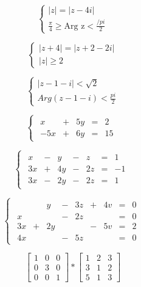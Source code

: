 \documentclass[11pt, a4paper]{article}
\begin{document}
$$\begin{cases}
    |z| = |z - 4i| \\
    \frac{\pi}{4} \geq \textrm{Arg z} < \frac{/pi}{2}
\end{cases}$$

$$\begin{cases}
    |z+4| = |z + 2 - 2i| \\
    |z|\geq 2
\end{cases}$$

$$\begin{cases}
    |z-1-i| < \sqrt{2} \\
    Arg(z-1-i) < \frac{pi}{2}
\end{cases}$$

$$\begin{cases}
\begin{array}{ccccc}
    x & + & 5y & = & 2  \\
    -5x & + & 6y & = & 15
\end{array}
\end{cases}$$

$$\begin{cases}
\begin{array}{cccccccc}
    x & - & y & - & z & = & 1  \\
    3x & + & 4y & - & 2z & = & -1  \\
    3x & - & 2y & - & 2z & = & 1
\end{array}
\end{cases}$$

$$\begin{cases}
\begin{array}{ccccccccc}
    & & y & - & 3z & + & 4v & = & 0  \\
    x &  &  & - & 2z & & & = & 0  \\
    3x & + & 2y &  &  & - & 5v & = & 2  \\
    4x &  &  & - & 5z & & & = & 0  
\end{array}
\end{cases}$$

$$
\left[\begin{array}{ccc}
    1 & 0 & 0 \\
    0 & 3 & 0 \\
    0 & 0 & 1
\end{array}\right]
*
\left[\begin{array}{ccc}
    1 & 2 & 3 \\
    3 & 1 & 2 \\
    5 & 1 & 3
\end{array}\right]
$$
\end{document}
